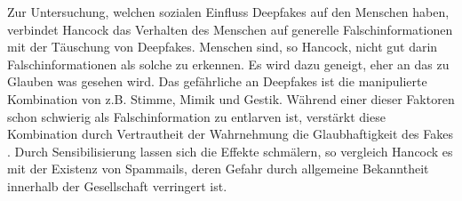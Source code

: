 \par
Zur Untersuchung, welchen sozialen Einfluss Deepfakes auf den Menschen haben, verbindet Hancock das Verhalten des Menschen auf generelle Falschinformationen mit der Täuschung von Deepfakes.
Menschen sind, so Hancock, nicht gut darin Falschinformationen als solche zu erkennen.
Es wird dazu geneigt, eher an das zu Glauben was gesehen wird.
Das gefährliche an Deepfakes ist die manipulierte Kombination von z.B. Stimme, Mimik und Gestik.
Während einer dieser Faktoren schon schwierig als Falschinformation zu entlarven ist, verstärkt diese Kombination durch Vertrautheit der Wahrnehmung die Glaubhaftigkeit des Fakes \citep[Vgl.][]{Hancock2021}.
Durch Sensibilisierung lassen sich die Effekte schmälern, so vergleich Hancock es mit der Existenz von Spammails, deren Gefahr durch allgemeine Bekanntheit innerhalb der Gesellschaft verringert ist.






